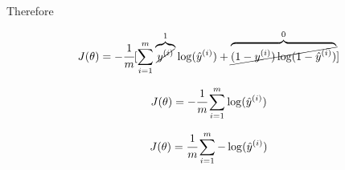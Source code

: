 Therefore

$$
J( \theta) = -\cfrac{1} {m} \lbrack \sum_{i = 1}^{m} \overbrace{\cancel{y^{(i)}}}^{1}\log(\hat{y}^{(i)}) + \overbrace{\cancel{(1 - y^{(i)})\log(1 - \hat{y}^{(i)})}}^{0}\rbrack
$$

$$
J( \theta) = -\cfrac{1} {m} \sum_{i = 1}^{m} \log(\hat{y}^{(i)})
$$

$$
J( \theta) = \cfrac{1} {m} \sum_{i = 1}^{m} -\log(\hat{y}^{(i)})
$$
